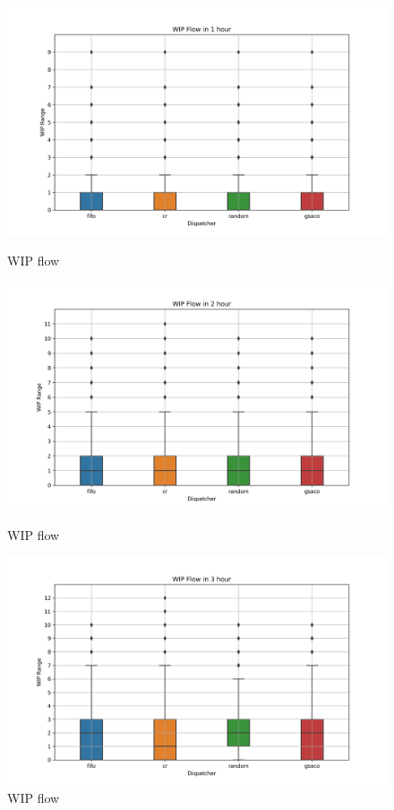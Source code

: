 \documentclass[runningheads]{llncs}
\begin{document}
\begin{figure}[t]
	\centering
	\begin{minipage}{0.32\textwidth}
		\includegraphics[width=\textwidth]{period_3600s.png}
		\caption{WIP flow}
		\label{fig:p1}
	\end{minipage}\hfill
	\begin{minipage}{0.32\textwidth}
		\includegraphics[width=\textwidth]{period_7200s.png}
		\caption{WIP flow}
		\label{fig:p2}
	\end{minipage}\hfill
	\begin{minipage}{0.32\textwidth}
		\includegraphics[width=\textwidth]{period_10800s.png}
		\caption{WIP flow}
		\label{fig:p3}
	\end{minipage}
\end{figure}
\end{document}
